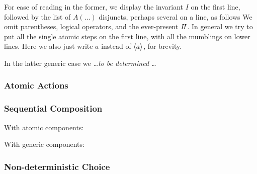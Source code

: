 For ease of reading in the former,
we display the invariant $I$ on the first line,
followed by the list of $A(\dots)$ disjuncts, perhaps several on a line,
as follows
We omit parentheses, logical operators, and the ever-present $I\!I$.
In general we try to put all the single atomic steps on the first line,
with all the mumblings on lower lines.
Here we also just write $a$ instead of $\langle a\rangle$,
for brevity.

In the latter generic case we  \emph{\dots to be determined \dots}

\subsubsection{Atomic Actions}



\subsubsection{Sequential Composition}

With atomic components:

With generic components:


\subsubsection{Non-deterministic Choice}


